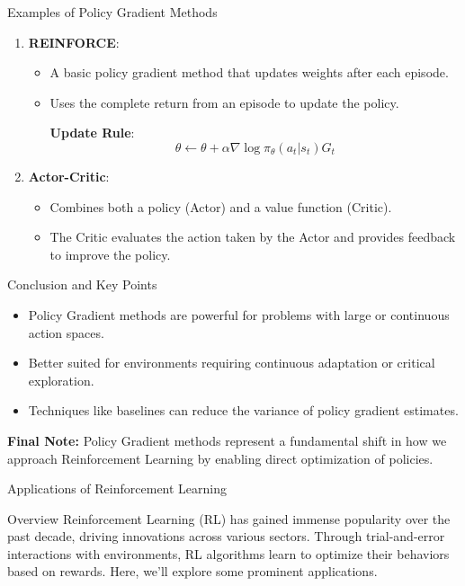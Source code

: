 \documentclass[aspectratio=169]{beamer}
\begin{document}
\begin{frame}[fragile]{Examples of Policy Gradient Methods}
    \begin{enumerate}
        \item \textbf{REINFORCE}:
            \begin{itemize}
                \item A basic policy gradient method that updates weights after each episode.
                \item Uses the complete return from an episode to update the policy.

                \textbf{Update Rule}:
                \begin{equation}
                    \theta \leftarrow \theta + \alpha \nabla \log \pi_\theta(a_t|s_t) G_t
                \end{equation}
            \end{itemize}
        
        \item \textbf{Actor-Critic}:
            \begin{itemize}
                \item Combines both a policy (Actor) and a value function (Critic).
                \item The Critic evaluates the action taken by the Actor and provides feedback to improve the policy.
            \end{itemize}
    \end{enumerate}
\end{frame}

\begin{frame}[fragile]{Conclusion and Key Points}
    \begin{itemize}
        \item Policy Gradient methods are powerful for problems with large or continuous action spaces.
        \item Better suited for environments requiring continuous adaptation or critical exploration.
        \item Techniques like baselines can reduce the variance of policy gradient estimates.
    \end{itemize}

    \textbf{Final Note:} Policy Gradient methods represent a fundamental shift in how we approach Reinforcement Learning by enabling direct optimization of policies.
\end{frame}

\begin{frame}{Applications of Reinforcement Learning}
    \begin{block}{Overview}
        Reinforcement Learning (RL) has gained immense popularity over the past decade, driving innovations across various sectors. Through trial-and-error interactions with environments, RL algorithms learn to optimize their behaviors based on rewards. Here, we’ll explore some prominent applications.
    \end{block}
\end{frame}
\end{document}
